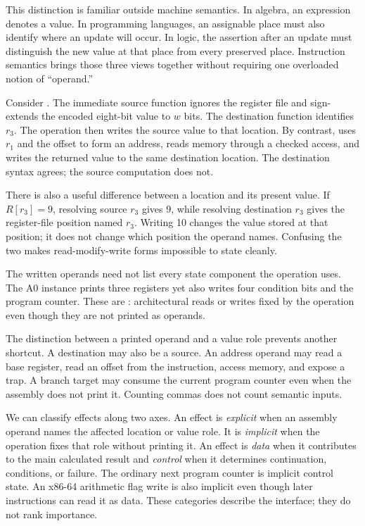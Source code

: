 This distinction is familiar outside machine semantics. In algebra, an
expression denotes a value. In programming languages, an assignable place
must also identify where an update will occur. In logic, the assertion after
an update must distinguish the new value at that place from every preserved
place. Instruction semantics brings those three views together without
requiring one overloaded notion of ``operand.''

Consider . The immediate source function ignores the register
file and sign-extends the encoded eight-bit value to \(w\) bits. The
destination function identifies \(r_3\). The operation then writes the source
value to that location. By contrast,  uses \(r_1\) and
the offset to form an address, reads memory through a checked access, and
writes the returned value to the same destination location. The destination
syntax agrees; the source computation does not.

There is also a useful difference between a location and its present value.
If \(R[r_3]=9\), resolving source \(r_3\) gives 9, while resolving destination
\(r_3\) gives the register-file position named \(r_3\). Writing 10 changes
the value stored at that position; it does not change which position the
operand names. Confusing the two makes read-modify-write forms impossible to
state cleanly.

The written operands need not list every state component the operation uses.
The A0  instance prints three registers yet also writes four
condition bits and the program counter. These are :
architectural reads or writes fixed by the operation even though they are not
printed as operands.

The distinction between a printed operand and a value role prevents another
shortcut. A destination may also be a source. An address operand may read a
base register, read an offset from the instruction, access memory, and expose
a trap. A branch target may consume the current program counter even when the
assembly does not print it. Counting commas does not count semantic inputs.

We can classify effects along two axes. An effect is \emph{explicit} when an
assembly operand names the affected location or value role. It is
\emph{implicit} when the operation fixes that role without printing it. An
effect is \emph{data} when it contributes to the main calculated result and
\emph{control} when it determines continuation, conditions, or failure. The
ordinary next program counter is implicit control state. An x86-64 arithmetic
flag write is also implicit even though later instructions can read it as
data. These categories describe the interface; they do not rank importance.

